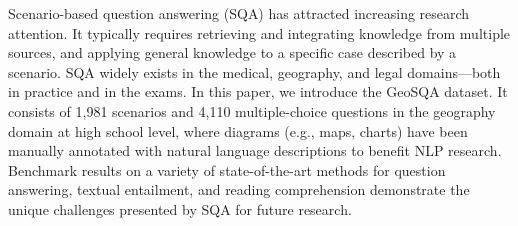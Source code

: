 Scenario-based question answering (SQA) has attracted increasing research attention. It typically requires retrieving and integrating knowledge from multiple sources, and applying general knowledge to a specific case described by a scenario. SQA widely exists in the medical, geography, and legal domains---both in practice and in the exams. In this paper, we introduce the GeoSQA dataset. It consists of 1,981 scenarios and 4,110 multiple-choice questions in the geography domain at high school level, where diagrams (e.g., maps, charts) have been manually annotated with natural language descriptions to benefit NLP research. Benchmark results on a variety of state-of-the-art methods for question answering, textual entailment, and reading comprehension demonstrate the unique challenges presented by SQA for future research.